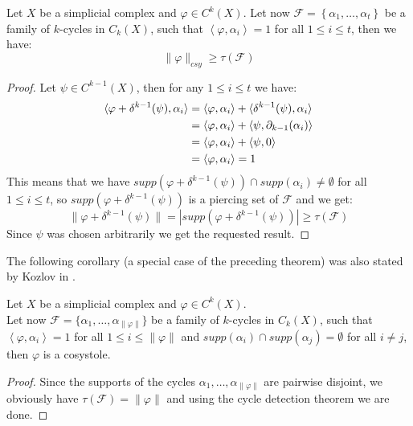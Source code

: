 \begin{thm}\label{theorem9}
Let \(X\) be a simplicial complex and \(\varphi\in C^k(X)\). Let now \(\mathcal{F}=\left\{\alpha_1,\ldots,\alpha_t\right\}\) be a family of \(k\)-cycles in \(C_k(X)\), such that \(\left\langle\varphi,\alpha_i\right\rangle=1\) for all \(1\leq i\leq t\), then we have:
\[
\|\varphi\|_{csy}\geq\tau(\mathcal{F})
\]
\begin{proof}
Let \(\psi\in C^{k-1}(X)\), then for any \(1\leq i\leq t\) we have:
\begin{align}
\langle\varphi+\delta^{k-1}(\psi),\alpha_i\rangle&=\langle\varphi,\alpha_i\rangle+\langle\delta^{k-1}(\psi),\alpha_i\rangle\notag\\
&=\langle\varphi,\alpha_i\rangle+\langle\psi,\partial_{k-1}(\alpha_i)\rangle\notag\\
&=\langle\varphi,\alpha_i\rangle+\langle\psi,0\rangle\notag\\
&=\langle\varphi,\alpha_i\rangle=1\notag
\end{align}
This means that we have \(supp(\varphi+\delta^{k-1}(\psi))\cap supp(\alpha_i)\neq\emptyset\) for all \(1\leq i\leq t\), so \(supp(\varphi+\delta^{k-1}(\psi))\) is a piercing set of \(\mathcal{F}\) and we get:
\[
\|\varphi+\delta^{k-1}(\psi)\|=|supp(\varphi+\delta^{k-1}(\psi))|\geq\tau(\mathcal{F})
\]
Since \(\psi\) was chosen arbitrarily we get the requested result.
\end{proof}
\end{thm}

The following corollary (a special case of the preceding theorem) was also stated by Kozlov in \cite{6}.

\begin{cor}
Let \(X\) be a simplicial complex and \(\varphi\in C^k(X)\).\\
Let now \(\mathcal{F}=\{\alpha_1,\ldots,\alpha_{\|\varphi\|}\}\) be a family of \(k\)-cycles in \(C_k(X)\), such that \(\left\langle\varphi,\alpha_i\right\rangle=1\) for all \(1\leq i\leq\|\varphi\|\) and \(supp(\alpha_i)\cap supp(\alpha_j)=\emptyset\) for all \(i\neq j\), then \(\varphi\) is a cosystole.
\begin{proof}
Since the supports of the cycles \(\alpha_1,\ldots,\alpha_{\|\varphi\|}\) are pairwise disjoint, we obviously have \(\tau(\mathcal{F})=\|\varphi\|\) and using the cycle detection theorem we are done.
\end{proof}
\end{cor}

\begin{expl}

\end{expl}

